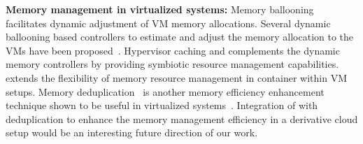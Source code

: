 \noindent
{\bf Memory management in virtualized systems:} Memory 
ballooning~\cite{vmware,hotplug} facilitates dynamic adjustment of VM memory  
allocations.
%
Several dynamic ballooning based controllers to estimate and adjust the memory 
allocation to the VMs have been proposed~\cite{wss, membal, tws}.
%
Hypervisor caching and \dd{} complements the dynamic memory controllers
by providing symbiotic resource management capabilities.
%
\dd{} extends the flexibility of memory resource management in container 
within VM setups.
%
Memory deduplication~\cite{vmware,ksmpaper,satori} is another memory
efficiency enhancement technique shown to be useful in virtualized
systems~\cite{ksmpaper,utc}.   
%
Integration of \dd{} with deduplication to enhance the memory management
efficiency in a derivative cloud setup would be an interesting future
direction of our work.
%
%
%

